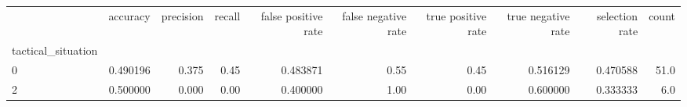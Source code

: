\begin{tabular}{lrrrrrrrrr}
\toprule
{} &  accuracy &  precision &  recall &  false positive rate &  false negative rate &  true positive rate &  true negative rate &  selection rate &  count \\
tactical\_situation &           &            &         &                      &                      &                     &                     &                 &        \\
\midrule
0                  &  0.490196 &      0.375 &    0.45 &             0.483871 &                 0.55 &                0.45 &            0.516129 &        0.470588 &   51.0 \\
2                  &  0.500000 &      0.000 &    0.00 &             0.400000 &                 1.00 &                0.00 &            0.600000 &        0.333333 &    6.0 \\
\bottomrule
\end{tabular}
